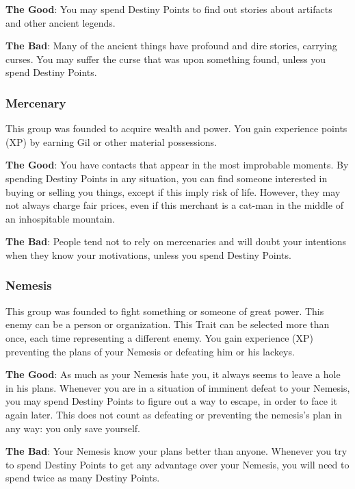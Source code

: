 \begin{multicols}{2}
\begin{ffcolpage}
\textbf{The Good}: You may spend Destiny Points to find out stories about artifacts and other ancient legends.

\textbf{The Bad}: Many of the ancient things have profound and dire stories, carrying curses. You may suffer the curse that was upon something found, unless you spend Destiny Points. \pc%

\begin{center}
\end{center}
\end{ffcolpage}

\subsubsection{Mercenary}
This group was founded to acquire wealth and power. You gain experience points (XP) by earning Gil or other material possessions.

\textbf{The Good}: You have contacts that appear in the most improbable moments. By spending Destiny Points in any situation, you can find someone interested in buying or selling you things, except if this imply risk of life. However, they may not always charge fair prices, even if this merchant is a cat-man in the middle of an inhospitable mountain.

\textbf{The Bad}: People tend not to rely on mercenaries and will doubt your intentions when they know your motivations, unless you spend Destiny Points.

\subsubsection{Nemesis}
This group was founded to fight something or someone of great power. This enemy can be a person or organization. This Trait can be selected more than once, each time representing a different enemy. You gain experience (XP) preventing the plans of your Nemesis or defeating him or his lackeys.

\textbf{The Good}: As much as your Nemesis hate you, it always seems to leave a hole in his plans. Whenever you are in a situation of imminent defeat to your Nemesis, you may spend Destiny Points to figure out a way to escape, in order to face it again later. This does not count as defeating or preventing the nemesis’s plan in any way: you only save yourself.

\textbf{The Bad}: Your Nemesis know your plans better than anyone. Whenever you try to spend Destiny Points to get any advantage over your Nemesis, you will need to spend twice as many Destiny Points.


\end{multicols}
